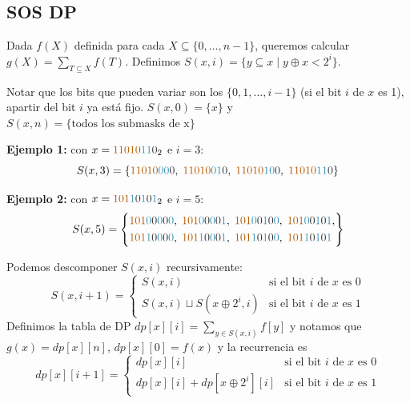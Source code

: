 \subsection{SOS DP}

Dada $f(X)$ definida para cada $X\subseteq\{0,\dots,n-1\}$, queremos calcular
$
g(X)=\sum_{T\subseteq X} f(T).
$
Definimos 
$
S(x, i) = \{ y \subseteq x \mid y \oplus x < 2^i \}.
$

Notar que 
los bits que pueden variar son los $\{0, 1, \dots, i-1\}$ (si el bit $i$ de $x$ es 1), apartir del bit $i$ ya está fijo. $ S(x, 0) = \{x\}$ y $S(x, n) = \{\text{todos los submasks de x}\} $



\newcommand{\fijo}[1]{\textcolor{orange!70!black}{#1}}
\newcommand{\vari}[1]{\textcolor{cyan!70!black}{#1}}
\newcommand{\cero}[1]{\textcolor{black!80}{#1}}
\textbf{Ejemplo 1:} con $x = \fijo{11010}\vari{11}\cero{0}_2$ e $i = 3$:
\[
S(x, 3) = \{
  \fijo{11010}\vari{00}\cero{0},\;
  \fijo{11010}\vari{01}\cero{0},\;
  \fijo{11010}\vari{10}\cero{0},\;
  \fijo{11010}\vari{11}\cero{0}
\}
\]

\textbf{Ejemplo 2:} con $x = \fijo{101}\vari{1}\cero{0}\vari{1}\cero{0}\vari{1}_2$ e $i = 5$:
\[
S(x, 5) = \left\{
\begin{aligned}
  &\fijo{101}\vari{0}\cero{0}\vari{0}\cero{0}\vari{0},\;
   \fijo{101}\vari{0}\cero{0}\vari{0}\cero{0}\vari{1},\;
   \fijo{101}\vari{0}\cero{0}\vari{1}\cero{0}\vari{0},\;
   \fijo{101}\vari{0}\cero{0}\vari{1}\cero{0}\vari{1},\\
  &\fijo{101}\vari{1}\cero{0}\vari{0}\cero{0}\vari{0},\;
   \fijo{101}\vari{1}\cero{0}\vari{0}\cero{0}\vari{1},\;
   \fijo{101}\vari{1}\cero{0}\vari{1}\cero{0}\vari{0},\;
   \fijo{101}\vari{1}\cero{0}\vari{1}\cero{0}\vari{1}
\end{aligned}
\right\}
\]

Podemos descomponer $S(x, i)$ recursivamente:
\[
S(x, i+1) =
\begin{cases}
S(x, i) & \text{si el bit $i$ de $x$ es 0} \\
S(x, i) \sqcup S(x \oplus 2^i, i) & \text{si el bit $i$ de $x$ es 1}
\end{cases}
\]
Definimos la tabla de DP $dp[x][i] = \sum_{y \in S(x, i)} f[y]$ y notamos que
$g(x) = dp[x][n]$,  $dp[x][0]=f(x)$ y la recurrencia es
\[
dp[x][i+1] =
\begin{cases}
dp[x][i] & \text{si el bit $i$ de $x$ es 0} \\
dp[x][i] + dp[x \oplus 2^i][i] & \text{si el bit $i$ de $x$ es 1}
\end{cases}
\]

